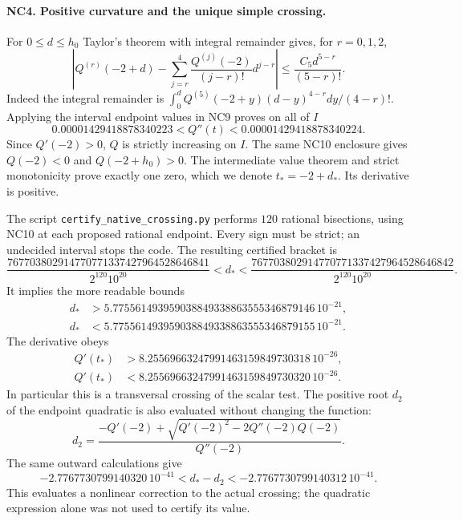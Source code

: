 \paragraph{NC4. Positive curvature and the unique simple crossing.}
For $0\le d\le h_0$ Taylor's theorem with integral remainder gives,
for $r=0,1,2$,
\[
 \left|Q^{(r)}(-2+d)-
 \sum_{j=r}^4\frac{Q^{(j)}(-2)}{(j-r)!}d^{j-r}\right|
 \le\frac{C_5d^{5-r}}{(5-r)!}.
 \tag{NC10}
\]
Indeed the integral remainder is
$\int_0^d Q^{(5)}(-2+y)(d-y)^{4-r}dy/(4-r)!$.
Applying the interval endpoint values in NC9 proves on all of $I$
\[
 0.00001429418878340223<Q''(t)
 <0.00001429418878340224.
 \tag{NC11}
\]
Since $Q'(-2)>0$, $Q$ is strictly increasing on $I$.
The same NC10 enclosure gives $Q(-2)<0$ and $Q(-2+h_0)>0$.
The intermediate value theorem and strict monotonicity prove exactly
one zero, which we denote $t_*=-2+d_*$. Its derivative is positive.

The script \texttt{certify\_native\_crossing.py} performs $120$
rational bisections, using NC10 at each proposed rational endpoint.
Every sign must be strict; an undecided interval stops the code.
The resulting certified bracket is
\[
 \frac{767703802914770771337427964528646841}
      {2^{120}10^{20}}
 <d_*<
 \frac{767703802914770771337427964528646842}
      {2^{120}10^{20}}.
 \tag{NC12}
\]
It implies the more readable bounds
\[
\begin{aligned}
d_*&>5.775561493959038849338863555346879146\,10^{-21},\\
d_*&<5.775561493959038849338863555346879155\,10^{-21}.
\end{aligned}\tag{NC13}
\]
The derivative obeys
\[
 \begin{aligned}
 Q'(t_*)&>8.25569663247991463159849730318\,10^{-26},\\
 Q'(t_*)&<8.25569663247991463159849730320\,10^{-26}.
 \end{aligned}
 \tag{NC14}
\]
In particular this is a transversal crossing of the scalar test.
The positive root $d_2$ of the endpoint quadratic is also evaluated
without changing the function:
\[
 d_2=\frac{-Q'(-2)+
 \sqrt{Q'(-2)^2-2Q''(-2)Q(-2)}}{Q''(-2)}.
 \tag{NC15}
\]
The same outward calculations give
\[
 -2.7767730799140320\,10^{-41}<d_*-d_2
 <-2.7767730799140312\,10^{-41}.
 \tag{NC16}
\]
This evaluates a nonlinear correction to the actual crossing;
the quadratic expression alone was not used to certify its value.

